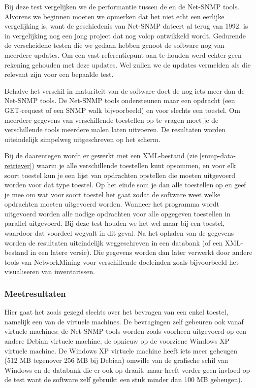 
Bij deze test vergelijken we de performantie tussen de \nwmretriever{} en de Net-SNMP tools.
Alvorens we beginnen moeten we opmerken dat het niet echt een eerlijke vergelijking is,
want de geschiedenis van Net-SNMP dateert al terug van 1992\cite{net-snmp-history}.
\nwmretriever{} is in vergelijking nog een jong project dat nog volop ontwikkeld wordt.
Gedurende de verscheidene testen die we gedaan hebben genoot de software nog van meerdere updates.
Om een vast referentiepunt aan te houden werd echter geen rekening gehouden met deze updates.
Wel zullen we de updates vermelden als die relevant zijn voor een bepaalde test.

Behalve het verschil in maturiteit van de software doet de \nwmretriever{} nog iets meer dan de Net-SNMP tools.
De Net-SNMP tools ondersteunen maar een opdracht (een GET-request of een SNMP walk bijvoorbeeld) en voor slechts een toestel.
Om meerdere gegevens van verschillende toestellen op te vragen moet je de verschillende tools meerdere malen laten uitvoeren.
De resultaten worden uiteindelijk simpelweg uitgeschreven op het scherm.

Bij de \nwmretriever{} daarentegen wordt er gewerkt met een XML-bestand (zie \cref{snmp-data-retriever}) waarin je alle verschillende toestellen kunt opsommen,
en voor elk soort toestel kun je een lijst van opdrachten opstellen die moeten uitgevoerd worden voor dat type toestel.
Op het einde som je dan alle toestellen op en geef je mee om wat voor soort toestel het gaat zodat de software weet welke opdrachten moeten uitgevoerd worden.
Wanneer het programma wordt uitgevoerd worden alle nodige opdrachten voor alle opgegeven toestellen in parallel uitgevoerd.
Bij deze test houden we het wel maar bij een toestel, waardoor dat voordeel wegvalt in dit geval.
Na het ophalen van de gegevens worden de resultaten uiteindelijk weggeschreven in een databank (of een XML-bestand in een latere versie).
Die gegevens worden dan later verwerkt door andere tools van NetworkMining voor verschillende doeleinden zoals bijvoorbeeld het visualiseren van inventarissen.

\subsubsection{Meetresultaten}

Hier gaat het zoals gezegd slechts over het bevragen van een enkel toestel, namelijk een van de virtuele machines.
De bevragingen zelf gebeuren ook vanaf virtuele machines: de Net-SNMP tools worden zoals voorheen uitgevoerd op een andere Debian virtuele machine,
de \nwmretriever opnieuw op de voorziene Windows XP virtuele machine.
De Windows XP virtuele machine heeft iets meer geheugen (512 MB tegenover 256 MB bij Debian) omwille van
de grafische schil van Windows en de databank die er ook op draait,
maar heeft verder geen invloed op de test want de software zelf gebruikt een stuk minder dan 100 MB geheugen).

